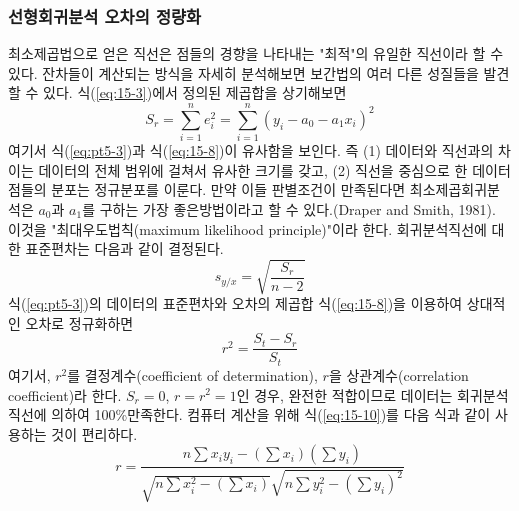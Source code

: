 \subsubsection{선형회귀분석 오차의 정량화}
최소제곱법으로 얻은 직선은 점들의 경향을 나타내는 "최적"의 유일한 직선이라 할 수 있다. 잔차들이 계산되는 방식을 자세히 분석해보면 보간법의 여러 다른 성질들을 발견할 수 있다. 식(\ref{eq:15-3})에서 정의된 제곱합을 상기해보면
\begin{equation}\label{eq:15-8}
S_{r}=\sum_{i=1}^{n}e_{i}^{2}=\sum_{i=1}^{n}\left(y_{i}-a_{0}-a_{1}x_{i}\right)^{2}
\end{equation}
여기서 식(\ref{eq:pt5-3})과 식(\ref{eq:15-8})이 유사함을 보인다. 즉 (1) 데이터와 직선과의 차이는 데이터의 전체 범위에 걸쳐서 유사한 크기를 갖고, (2) 직선을 중심으로 한 데이터점들의 분포는 정규분포를 이룬다. 만약 이들 판별조건이 만족된다면 최소제곱회귀분석은 $a_{0}$과 $a_{1}$를 구하는 가장 좋은방법이라고 할 수 있다.(Draper and Smith, 1981). 이것을 "최대우도법칙(maximum likelihood principle)"이라 한다.
회귀분석직선에 대한 표준편차는 다음과 같이 결정된다.
\begin{equation}\label{eq:15-9}
s_{y/x}=\sqrt{\frac{S_{r}}{n-2}}
\end{equation}
식(\ref{eq:pt5-3})의 데이터의 표준편차와 오차의 제곱합 식(\ref{eq:15-8})을 이용하여 상대적인 오차로 정규화하면
\begin{equation}\label{eq:15-10}
r^{2}=\frac{S_{t}-S_{r}}{S_{t}}
\end{equation}
여기서, $r^{2}$를 결정계수(coefficient of determination), $r$을 상관계수(correlation coefficient)라 한다. $S_{r}=0$, $r=r^{2}=1$인 경우, 완전한 적합이므로 데이터는 회귀분석직선에 의하여 100\%만족한다. 컴퓨터 계산을 위해 식(\ref{eq:15-10})를 다음 식과 같이 사용하는 것이 편리하다.
\begin{equation}
r=\frac{n\sum x_{i}y_{i}-\left(\sum x_{i}\right)\left(\sum y_{i}\right)}{\sqrt{n\sum x_{i}^{2}-\left(\sum x_{i}\right)}\sqrt{n\sum y_{i}^{2} -\left(\sum y_{i}\right)^2}}
\end{equation}

